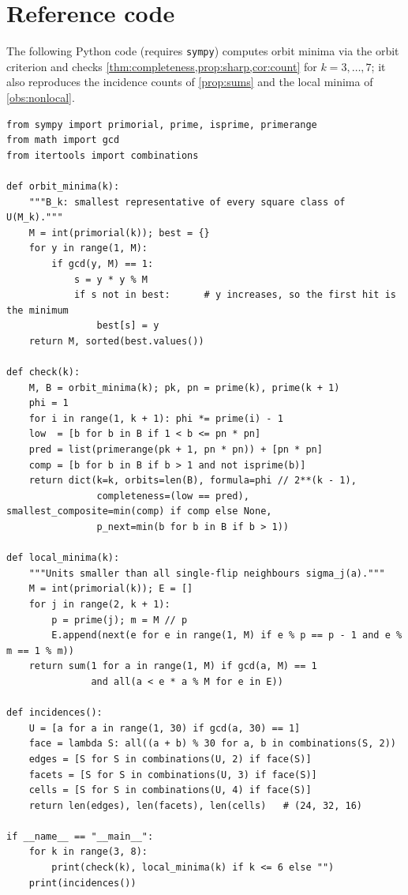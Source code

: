 \documentclass[11pt,a4paper]{article}
\theoremstyle{plain}
\theoremstyle{definition}
\theoremstyle{remark}
\begin{document}
\section{Reference code}\label{app:code}
The following Python code (requires \texttt{sympy}) computes orbit minima via
the orbit criterion and checks \cref{thm:completeness,prop:sharp,cor:count}
for $k=3,\dots,7$; it also reproduces the incidence counts of
\cref{prop:sums} and the local minima of \cref{obs:nonlocal}.
\begin{lstlisting}
from sympy import primorial, prime, isprime, primerange
from math import gcd
from itertools import combinations

def orbit_minima(k):
    """B_k: smallest representative of every square class of U(M_k)."""
    M = int(primorial(k)); best = {}
    for y in range(1, M):
        if gcd(y, M) == 1:
            s = y * y % M
            if s not in best:      # y increases, so the first hit is the minimum
                best[s] = y
    return M, sorted(best.values())

def check(k):
    M, B = orbit_minima(k); pk, pn = prime(k), prime(k + 1)
    phi = 1
    for i in range(1, k + 1): phi *= prime(i) - 1
    low  = [b for b in B if 1 < b <= pn * pn]
    pred = list(primerange(pk + 1, pn * pn)) + [pn * pn]
    comp = [b for b in B if b > 1 and not isprime(b)]
    return dict(k=k, orbits=len(B), formula=phi // 2**(k - 1),
                completeness=(low == pred), smallest_composite=min(comp) if comp else None,
                p_next=min(b for b in B if b > 1))

def local_minima(k):
    """Units smaller than all single-flip neighbours sigma_j(a)."""
    M = int(primorial(k)); E = []
    for j in range(2, k + 1):
        p = prime(j); m = M // p
        E.append(next(e for e in range(1, M) if e % p == p - 1 and e % m == 1 % m))
    return sum(1 for a in range(1, M) if gcd(a, M) == 1
               and all(a < e * a % M for e in E))

def incidences():
    U = [a for a in range(1, 30) if gcd(a, 30) == 1]
    face = lambda S: all((a + b) % 30 for a, b in combinations(S, 2))
    edges = [S for S in combinations(U, 2) if face(S)]
    facets = [S for S in combinations(U, 3) if face(S)]
    cells = [S for S in combinations(U, 4) if face(S)]
    return len(edges), len(facets), len(cells)   # (24, 32, 16)

if __name__ == "__main__":
    for k in range(3, 8):
        print(check(k), local_minima(k) if k <= 6 else "")
    print(incidences())
\end{lstlisting}
\end{document}
